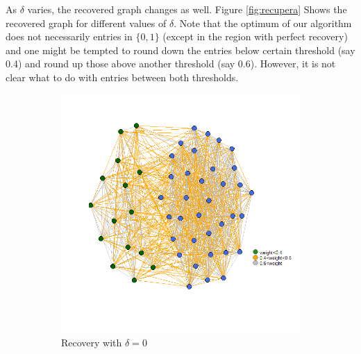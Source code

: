 \documentclass[12pt]{amsart}
\theoremstyle{remark}
\begin{document}
As $\delta$ varies, the recovered graph changes as well. Figure   \ref{fig:recupera} Shows the recovered graph for different values of $\delta$. Note that the optimum of our algorithm does not necessarily entries in $\{0,1\}$ (except in the region with perfect recovery) and one might be tempted to round down the entries below certain threshold (say 0.4) and round up those above another threshold (say 0.6). However, it is not clear what to do with entries between both thresholds. 




\begin{figure}[h]
     \centering
     \begin{subfigure}[b]{0.37\textwidth}
         \centering
         \includegraphics[width=\textwidth]{./Pictures/recupera0.png}
         \caption{Recovery with $\delta=0$}
     \end{subfigure}
     \hfill
     \begin{subfigure}[b]{0.37\textwidth}
         \centering

\end{subfigure}
\end{figure}
\end{document}
